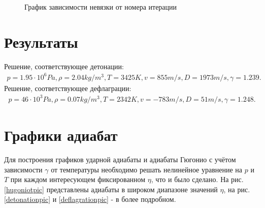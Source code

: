 \documentclass[12pt]{article}
\begin{document}
\begin{figure}[H]
\caption{График зависимости невязки от номера итерации}
\label{conergencepic}
\end{figure}

\section{Результаты}\label{results}
Решение, соответствующее детонации:
\begin{eqnarray}
p = 1.95\cdot10^6 Pa, \rho = 2.04 kg/m^3, T = 3425 K, v = 855 m/s, D = 1973 m/s, \gamma = 1.239. 
\end{eqnarray}
Решение, соответствующее дефлаграции:
\begin{eqnarray}
p = 46\cdot10^3 Pa, \rho = 0.07 kg/m^3, T = 2342 K, v = -783 m/s, D = 51 m/s, \gamma = 1.248. 
\end{eqnarray}

\section{Графики адиабат}\label{hugoniots}
Для построения графиков ударной адиабаты и адиабаты Гюгонио с учётом зависимости $\gamma$ от температуры необходимо
решать нелинейное уравнение на $p$ и $T$ при каждом интересующем фиксированном $\eta$, что и было сделано.
На рис.\ref{hugoniotpic} представлены адиабаты в широком диапазоне значений $\eta$, на рис.\ref{detonationpic} и \ref{deflagrationpic} - 
в более подробном.
\end{document}
